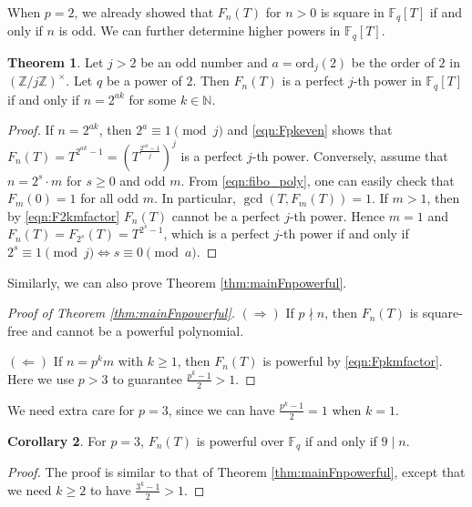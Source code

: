 \documentclass[letterpaper, 10pt]{article}
\newcommand{\bF}{\mathbb{F}}
\newcommand{\bN}{\mathbb{N}}
\newcommand{\bZ}{\mathbb{Z}}
\newcommand{\1}{\mathds{1}}	%
\theoremstyle{definition}
\newtheorem{theorem}{Theorem}[section]
\newtheorem{corollary}[theorem]{Corollary}
\theoremstyle{remark}
\begin{document}
When \(p = 2\), we already showed that \(F_n(T)\) for $n > 0$ is square in \(\bF_q[T]\) if and only if \(n\) is odd. We can further determine higher powers in \(\bF_q[T]\).
\begin{theorem}
\label{thm:mainFnp2}
    Let \(j > 2\) be an odd number and \(a = \mathrm{ord}_j(2)\) be the order of \(2\) in \((\bZ/j\bZ)^\times\).
    Let $q$ be a power of $2$.
    Then \(F_n(T)\) is a perfect \(j\)-th power in $\bF_q[T]$ if and only if \(n = 2^{ak}\) for some \(k \in \bN\).
\end{theorem}
\begin{proof}
    If $n = 2^{ak}$, then $2^a \equiv 1 \pmod{j}$ and \eqref{eqn:Fpkeven} shows that $F_{n}(T) = T^{2^{ak} - 1} = (T^{\frac{2^{ak} - 1}{j}})^{j}$ is a perfect $j$-th power.
    Conversely, assume that $n = 2^{s} \cdot m$ for $s \ge 0$ and odd $m$.
    From \eqref{eqn:fibo_poly}, one can easily check that $F_m(0) = 1$ for all odd $m$.
    In particular, $\gcd(T, F_m(T)) = 1$.
    If $m > 1$, then by \eqref{eqn:F2kmfactor} $F_n(T)$ cannot be a perfect $j$-th power.
    Hence $m = 1$ and $F_n(T) = F_{2^s}(T) = T^{2^{s} - 1}$, which is a perfect $j$-th power if and only if $2^s \equiv 1 \pmod{j} \Leftrightarrow s \equiv 0 \pmod{a}$.
\end{proof}

Similarly, we can also prove Theorem \ref{thm:mainFnpowerful}.
\begin{proof}[Proof of Theorem \ref{thm:mainFnpowerful}]
    $(\Rightarrow)$ If $p \nmid n$, then $F_n(T)$ is square-free and cannot be a powerful polynomial.

    $(\Leftarrow)$ If $n = p^k m$ with $k \ge 1$, then $F_n(T)$ is powerful by \eqref{eqn:Fpkmfactor}.
    Here we use $p > 3$ to guarantee $\frac{p^k - 1}{2} > 1$.
\end{proof}

We need extra care for $p = 3$, since we can have $\frac{p^k - 1}{2} = 1$ when $k = 1$.
\begin{corollary}
    \label{cor:powerfulp3}
    For $p = 3$, $F_n(T)$ is powerful over $\bF_q$ if and only if $9 \mid n$.
\end{corollary}
\begin{proof}
    The proof is similar to that of Theorem \ref{thm:mainFnpowerful}, except that we need $k \ge 2$ to have $\frac{3^k - 1}{2} > 1$.
\end{proof}
\end{document}
